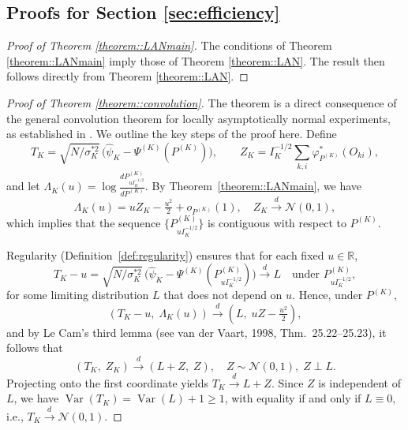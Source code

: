 \documentclass[11pt]{article}
\theoremstyle{plain}
\theoremstyle{definition}
\theoremstyle{remark}
\theoremstyle{definition}
\begin{document}
 

 





\subsection{Proofs for Section \ref{sec:efficiency}}


 

\begin{proof}[Proof of Theorem \ref{theorem::LANmain}]
    The conditions of Theorem \ref{theorem::LANmain} imply those of Theorem \ref{theorem::LAN}. The result then follows directly from Theorem \ref{theorem::LAN}.
\end{proof}


\begin{proof}[Proof of Theorem \ref{theorem::convolution}]
The theorem is a direct consequence of the general convolution theorem for locally asymptotically normal experiments, as established in \citet[Theorems 25.22--25.23]{van2000asymptotic}. We outline the key steps of the proof here.
Define
\[
T_K = \sqrt{N / \sigma_K^{*2}}\,\bigl(\widehat\psi_K - \Psi^{(K)}(P^{(K)})\bigr),
\qquad
Z_K = I_K^{-1/2} \sum_{k,i} \varphi^*_{P^{(K)}}(O_{ki}),
\]
and let \(\Lambda_K(u) = \log \tfrac{dP^{(K)}_{uI_K^{-1/2}}}{dP^{(K)}}\). By Theorem~\ref{theorem::LANmain}, we have
\[
\Lambda_K(u) = u Z_K - \tfrac{u^2}{2} + o_{P^{(K)}}(1),
\quad
Z_K \xrightarrow{d} \mathcal{N}(0,1),
\]
which implies that the sequence \(\{P^{(K)}_{uI_K^{-1/2}}\}\) is contiguous with respect to \(P^{(K)}\).

Regularity (Definition~\ref{def:regularity}) ensures that for each fixed \(u \in \mathbb{R}\),
\[
T_K - u 
= \sqrt{N / \sigma_K^{*2}}\,\bigl(\widehat\psi_K - \Psi^{(K)}(P^{(K)}_{uI_K^{-1/2}})\bigr) 
\xrightarrow{d} L 
\quad \text{under } P^{(K)}_{uI_K^{-1/2}},
\]
for some limiting distribution \(L\) that does not depend on \(u\). Hence, under \(P^{(K)}\),
\[
(T_K - u,\; \Lambda_K(u)) \xrightarrow{d} (L,\; uZ - \tfrac{u^2}{2}),
\]
and by Le Cam’s third lemma (see van der Vaart, 1998, Thm.~25.22--25.23), it follows that
\[
(T_K,\; Z_K) \xrightarrow{d} (L + Z,\; Z),
\quad
Z \sim \mathcal{N}(0,1),\; Z \perp L.
\]
Projecting onto the first coordinate yields \(T_K \xrightarrow{d} L + Z\). Since \(Z\) is independent of \(L\), we have \(\operatorname{Var}(T_K) = \operatorname{Var}(L) + 1 \ge 1\), with equality if and only if \(L \equiv 0\), i.e., \(T_K \xrightarrow{d} \mathcal{N}(0,1)\).
\end{proof}
\end{document}
